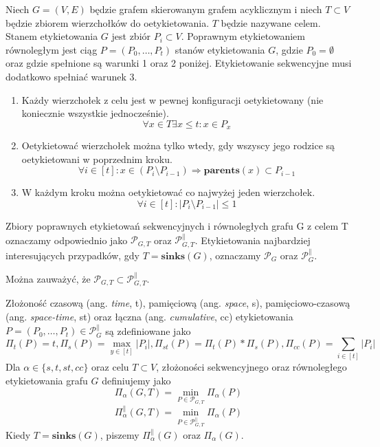 \begin{definition}  Niech $G = (V, E)$ będzie grafem skierowanym grafem acyklicznym i niech $T \subset V$ będzie zbiorem wierzchołków do oetykietowania. $T$ będzie nazywane celem.
	Stanem etykietowania $G$ jest zbiór $P_{i} \subset V$.
	Poprawnym etykietowaniem równoległym jest ciąg $P = (P_{0}, \dots , P_{t})$ stanów etykietowania $G$,
	gdzie $P_{0} = \emptyset $ oraz gdzie spełnione są warunki 1 oraz 2 poniżej.
	Etykietowanie sekwencyjne musi dodatkowo spełniać warunek 3.
	\begin{enumerate}
		\item Każdy wierzchołek z celu jest w pewnej konfiguracji oetykietowany (nie koniecznie wszystkie jednocześnie).
		$$ \forall x \in T \exists x \leq t : x \in P_{x} $$
		
		\item Oetykietować wierzchołek można tylko wtedy, gdy wszyscy jego rodzice
		są oetykietowani w poprzednim kroku.
		$$ \forall i \in [t] : x \in (P_{i} \setminus P_{i-1}) \Rightarrow \mathbf{parents}(x) \subset P_{i-1} $$
		
		\item W każdym kroku można oetykietować co najwyżej jeden wierzchołek.
		$$ \forall i \in [t]: | P_{i} \setminus P_{i-1} | \leq 1 $$
	\end{enumerate}
	Zbiory poprawnych etykietowań sekwencyjnych i równoległych grafu G z celem T oznaczamy odpowiednio jako 
	$ \mathcal{P}_{G,T} $ oraz $ \mathcal{P}_{G,T}^{ \parallel } $.
	Etykietowania najbardziej interesujących przypadków, gdy $T = \mathbf{sinks}(G)$, oznaczamy $ \mathcal{P}_{G} $ oraz $ \mathcal{P}_{G}^{ \parallel } $.
\end{definition}


 Można zauważyć, że $ \mathcal{P}_{G,T} \subset  \mathcal{P}_{G,T}^{ \parallel } $.

\begin{definition}
	Złożoność czasową (ang. \textit{time}, t), pamięciową (ang. \textit{space}, s), pamięciowo-czasową (ang. \textit{space-time}, st) oraz łączna (ang. \textit{cumulative}, cc) etykietowania $ P = (P_{0}, \dots , P_{t} ) \in \mathcal{P}_{G}^{ \parallel } $ są zdefiniowane jako
	$$ \Pi_{t}(P) = t, \Pi_{s}(P) = \max_{y \in [t]} | P_{i} |, \Pi_{st}(P) = \Pi_{t}(P) * \Pi_{s}(P), \Pi_{cc}(P) = \sum_{i \in [t]}| P_{i}|$$
	Dla $ \alpha \in \{s, t, st, cc \}$ oraz celu $T \subset V $, złożoności sekwencyjnego oraz równoległego
	etykietowania grafu $G$ definiujemy jako
	$$ \Pi_{ \alpha }(G, T) = \min_{P \in \mathcal{P}_{G,T}} \Pi_{ \alpha } (P) $$
	$$ \Pi_{ \alpha }^{ \parallel }(G, T) = \min_{P \in \mathcal{P}_{G,T}^{ \parallel }} \Pi_{ \alpha } (P) $$
	Kiedy $T = \mathbf{sinks}(G)$, piszemy $ \Pi_{ \alpha }^{ \parallel }(G) $ oraz $ \Pi_{ \alpha }(G) $.
	
\end{definition}

